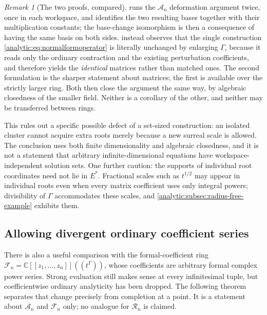 \documentclass[11pt,letterpaper]{article}
\theoremstyle{definition}
\theoremstyle{remark}
\newtheorem{remark}[theorem]{Remark}
\newcommand{\C}{\mathbb C}
\newcommand{\A}{\mathscr A}
\newcommand{\RR}{\mathscr R}
\newcommand{\FF}{\mathscr F}
\numberwithin{equation}{section}
\begin{document}
\begin{remark}[The two proofs, compared]
\label{analytic:rem:two-workspace-proofs}
 runs the $\A_n$ deformation argument twice,
once in each workspace, and identifies the two resulting bases together with
their multiplication constants; the base-change isomorphism is then a
consequence of having the same basis on both sides.
 instead observes that the single
construction \eqref{analytic:eq:normalformoperator} is literally unchanged
by enlarging $\Gamma$, because it reads only the ordinary contraction and
the existing perturbation coefficients, and therefore yields the
\emph{identical} matrices rather than matched ones. The second formulation
is the sharper statement about matrices; the first is available over the
strictly larger ring. Both then close the argument the same way, by
algebraic closedness of the smaller field. Neither is a corollary of the
other, and neither may be transferred between rings.
\end{remark}

This rules out a specific possible defect of a set-sized construction: an
isolated cluster cannot acquire extra roots merely because a new surreal
scale is allowed. The conclusion uses both finite dimensionality and
algebraic closedness, and it is not a statement that arbitrary
infinite-dimensional equations have workspace-independent solution sets.
One further caution: the supports of individual root coordinates need not
lie in $E^*$. Fractional scales such as $t^{1/2}$ may appear in individual
roots even when every matrix coefficient uses only integral powers;
divisibility of $\Gamma$ accommodates these scales, and
\cref{analytic:subsec:radius-free-example} exhibits them.

\subsection{Allowing divergent ordinary coefficient series}
\label{analytic:subsec:formal}
There is also a useful comparison with the formal-coefficient ring
$\FF_n=\C[[z_1,\ldots,z_n]]((t^\Gamma))$, whose coefficients are arbitrary
formal complex power series. Strong evaluation still makes sense at every
infinitesimal tuple, but coefficientwise ordinary analyticity has been
dropped. The following theorem separates that change precisely from
completion at a point. It is a statement about $\A_n$ and $\FF_n$ only; no
analogue for $\RR_n$ is claimed.
\end{document}
